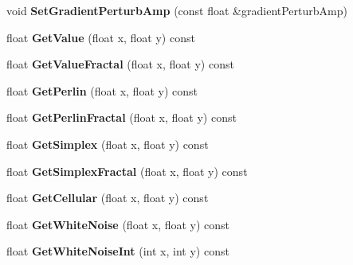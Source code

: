 \begin{DoxyCompactItemize}
void {\bfseries Set\+Gradient\+Perturb\+Amp} (const float \&gradient\+Perturb\+Amp)
\item 
\mbox{\label{class_flounder_1_1_noise_fast_a655ce98a6783d7052a405bd4e96520f4}} 
float {\bfseries Get\+Value} (float x, float y) const
\item 
\mbox{\label{class_flounder_1_1_noise_fast_aa02652dee69a7838d5f58c563914b67e}} 
float {\bfseries Get\+Value\+Fractal} (float x, float y) const
\item 
\mbox{\label{class_flounder_1_1_noise_fast_af5fab49219be64eb023b99002996c361}} 
float {\bfseries Get\+Perlin} (float x, float y) const
\item 
\mbox{\label{class_flounder_1_1_noise_fast_a6c78b54a3115a30d886e2bd4ed830c65}} 
float {\bfseries Get\+Perlin\+Fractal} (float x, float y) const
\item 
\mbox{\label{class_flounder_1_1_noise_fast_aa0ea60614315a2f7964c9fd7914411e7}} 
float {\bfseries Get\+Simplex} (float x, float y) const
\item 
\mbox{\label{class_flounder_1_1_noise_fast_acdef09b7705935521654748f1d37868a}} 
float {\bfseries Get\+Simplex\+Fractal} (float x, float y) const
\item 
\mbox{\label{class_flounder_1_1_noise_fast_adf040c2d557216788587b65cec648ebc}} 
float {\bfseries Get\+Cellular} (float x, float y) const
\item 
\mbox{\label{class_flounder_1_1_noise_fast_a62ca1b88304623d98763158802d4544f}} 
float {\bfseries Get\+White\+Noise} (float x, float y) const
\item 
\mbox{\label{class_flounder_1_1_noise_fast_ae5ac0a150d08729547d626a6ba95e5d9}} 
float {\bfseries Get\+White\+Noise\+Int} (int x, int y) const
\item 
\mbox{\label{class_flounder_1_1_noise_fast_abbfe69d3005f38cacde7ed822b93c9d1}} 

\end{DoxyCompactItemize}
